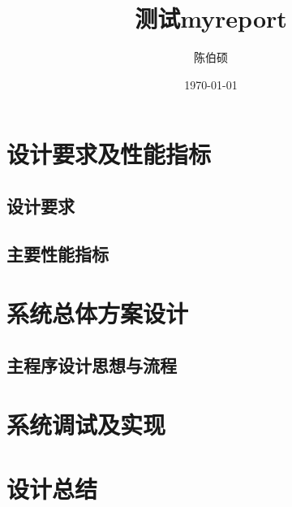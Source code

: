 \documentclass[pdfCover]{myreport} %
\title{测试myreport}
\author{陈伯硕}
\date{\today}
\begin{document}
\maketitle

\tableofcontents
\newpage

\section{设计要求及性能指标}
  \subsection{设计要求}
  \subsection{主要性能指标}

\section{系统总体方案设计}
  \subsection{主程序设计思想与流程}

\section{系统调试及实现}

\section{设计总结}



\nocite{*}
\end{document}

